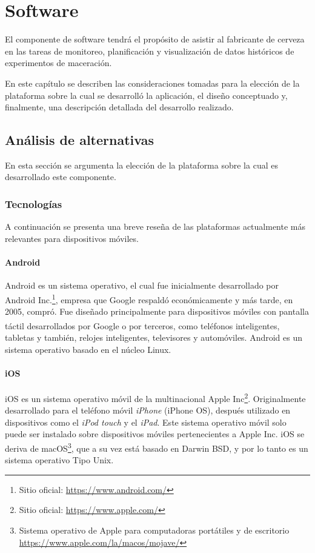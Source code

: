 \chapter{Software}
\par El componente de software tendrá el propósito de asistir al fabricante de cerveza en las tareas de monitoreo, planificación y visualización de datos históricos de experimentos de maceración.

\par En este capítulo se describen las consideraciones tomadas para la elección de la plataforma sobre la cual se desarrolló la aplicación, el diseño conceptuado y, finalmente, una descripción detallada del desarrollo realizado.

\section{Análisis de alternativas}
    En esta sección se argumenta la elección de la plataforma sobre la cual es desarrollado este componente.
    
    \subsection{Tecnologías}
        \par A continuación se presenta una breve reseña de las plataformas actualmente más relevantes para dispositivos móviles.
        
        \subsubsection{Android}
            \par Android es un sistema operativo, el cual fue inicialmente desarrollado por Android Inc.\footnote{Sitio oficial: \url{https://www.android.com/}}, empresa que Google\textsuperscript{\textregistered} respaldó económicamente y más tarde, en 2005, compró. Fue diseñado principalmente para dispositivos móviles con pantalla táctil desarrollados por Google\textsuperscript{\textregistered} o por terceros, como teléfonos inteligentes, tabletas y también, relojes inteligentes, televisores y automóviles. Android es un sistema operativo basado en el núcleo Linux.
            
        \subsubsection{iOS}
            \par iOS es un sistema operativo móvil de la multinacional Apple Inc\footnote{Sitio oficial: \url{https://www.apple.com/}}. Originalmente desarrollado para el teléfono móvil \textit{iPhone} (iPhone OS), después utilizado en dispositivos como el \textit{iPod touch} y el \textit{iPad}. Este sistema operativo móvil solo puede ser instalado sobre dispositivos móviles pertenecientes a Apple Inc. iOS se deriva de macOS\footnote{Sistema operativo de Apple para computadoras portátiles y de escritorio \url{https://www.apple.com/la/macos/mojave/}}, que a su vez está basado en Darwin BSD, y por lo tanto es un sistema operativo Tipo Unix.
            
